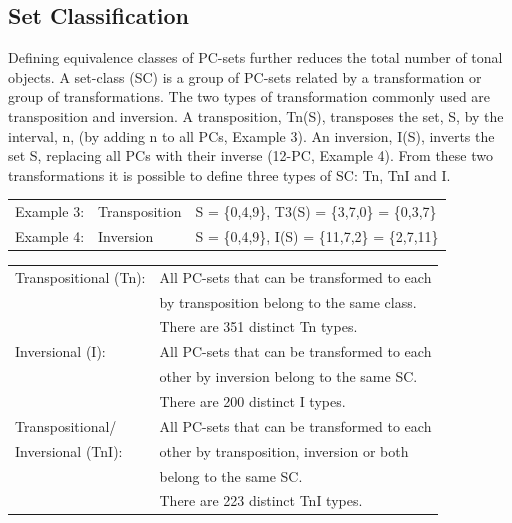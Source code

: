 \documentclass{article}
\begin{document}
\subsection{Set Classification}
\label{sec-3-2}

Defining equivalence classes of PC-sets further reduces the total
number of tonal objects. A set-class (SC) is a group of PC-sets
related by a transformation or group of transformations. The two types
of transformation commonly used are transposition and inversion. A
transposition, Tn(S), transposes the set, S, by the interval, n, (by
adding n to all PCs, Example 3). An inversion, I(S), inverts the set
S, replacing all PCs with their inverse (12-PC, Example 4). From these
two transformations it is possible to define three types of SC: Tn,
TnI and I.


\begin{center}
\begin{tabular}{lll}
 Example 3:  &  Transposition  &  S = \{0,4,9\}, T3(S) = \{3,7,0\} = \{0,3,7\}   \\
 Example 4:  &  Inversion      &  S = \{0,4,9\}, I(S) = \{11,7,2\} = \{2,7,11\}  \\
\end{tabular}
\end{center}


\begin{center}
\begin{tabular}{ll}
 Transpositional (Tn):  &  All PC-sets that can be transformed to each  \\
                        &  by transposition belong to the same class.   \\
                        &  There are 351 distinct Tn types.             \\
 Inversional (I):       &  All PC-sets that can be transformed to each  \\
                        &  other by inversion belong to the same SC.    \\
                        &  There are 200 distinct I types.              \\
 Transpositional/       &  All PC-sets that can be transformed to each  \\
 Inversional (TnI):     &  other by transposition, inversion or both    \\
                        &  belong to the same SC.                       \\
                        &  There are 223 distinct TnI types.            \\
\end{tabular}
\end{center}
\end{document}
